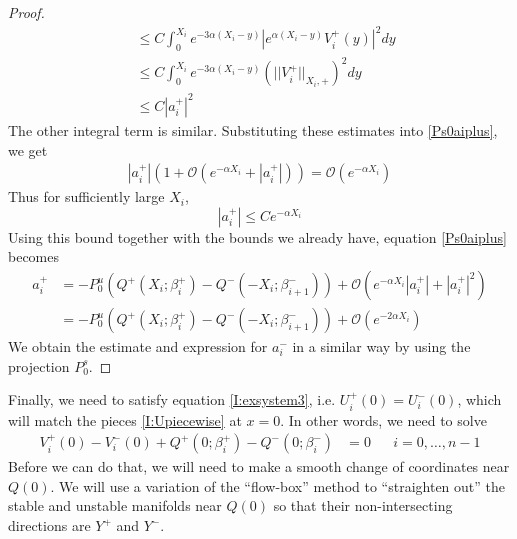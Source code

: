 \documentclass[thesis.tex]{subfiles}
\begin{document}
\begin{lemma}
\begin{proof}
\begin{align*}
&\leq C \int_0^{X_i}e^{-3 \alpha (X_i - y)} |e^{\alpha(X_i - y)} V_i^+(y)|^2 dy \\
&\leq C \int_0^{X_i}e^{-3 \alpha (X_i - y)} (||V_i^+||_{X_i, +})^2 dy \\
&\leq C |a_i^+|^2
\end{align*}
The other integral term is similar. Substituting these estimates into \eqref{Ps0aiplus}, we get
\begin{align*}
|a_i^+|\left(1 + \mathcal{O}(e^{-\alpha X_i} + |a_i^+|) \right) =  
\mathcal{O}( e^{-\alpha X_i} )
\end{align*}
Thus for sufficiently large $X_i$, 
\[
|a_i^+| \leq C e^{-\alpha X_i}
\]
Using this bound together with the bounds we already have, equation \eqref{Ps0aiplus} becomes
\begin{align*}
a_i^+ &= -P^u_0 \left( Q^+(X_i; \beta_i^+) - Q^-(-X_i; \beta_{i+1}^-) \right) 
+ \mathcal{O}\left( e^{-\alpha X_i} |a_i^+| + |a_i^+|^2 \right) \\
&= -P^u_0 \left( Q^+(X_i; \beta_i^+) - Q^-(-X_i; \beta_{i+1}^-) \right) 
+ \mathcal{O}\left( e^{-2 \alpha X_i} \right)
\end{align*}
We obtain the estimate and expression for $a_i^-$ in a similar way by using the projection $P_0^s$.
\end{proof}
\end{lemma}

Finally, we need to satisfy equation \eqref{I:exsystem3}, i.e. $U_i^+(0) = U_i^-(0)$, which will match the pieces \eqref{I:Upiecewise} at $x = 0$. In other words, we need to solve
\begin{align}\label{Umatchat0}
V_i^+(0) - V_i^-(0) + Q^+(0; \beta_i^+) - Q^-(0; \beta_i^-) &= 0  && i = 0, \dots, n-1
\end{align}
Before we can do that, we will need to make a smooth change of coordinates near $Q(0)$. We will use a variation of the ``flow-box'' method to ``straighten out'' the stable and unstable manifolds near $Q(0)$ so that their non-intersecting directions are $Y^+$ and $Y^-$.

\end{document}

